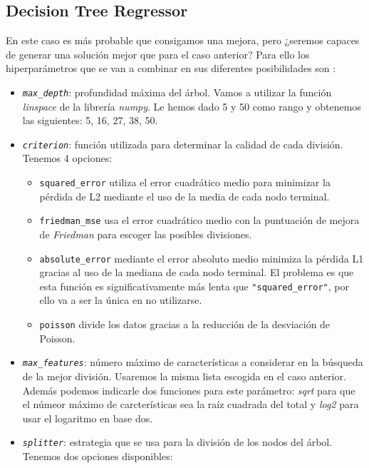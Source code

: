 \subsection{Decision Tree Regressor}
En este caso es más probable que consigamos una mejora, pero ¿seremos capaces de generar una solución mejor que para el caso anterior?
Para ello los hiperparámetros que se van a combinar en sus diferentes posibilidades son \cite{sklearn:decisiontreeregressor}:
\begin{itemize}
    \item \texttt{\textit{max\_depth}}: profundidad máxima del árbol. Vamos a utilizar la función \textit{linspace} de la librería \textit{numpy}. Le hemos dado 5 y 50 como rango y obtenemos las siguientes: 5, 16, 27, 38, 50.
    \item \texttt{\textit{criterion}}: función utilizada para determinar la calidad de cada división. Tenemos 4 opciones:
        \begin{itemize}
            \item \texttt{squared\_error} utiliza el error cuadrático medio para minimizar la pérdida de L2 mediante el uso de la media de cada nodo terminal.
            \item \texttt{friedman\_mse} usa el error cuadrático medio con la puntuación de mejora de \textit{Friedman} para escoger las posibles divisiones.
            \item \texttt{absolute\_error} mediante el error absoluto medio  minimiza la pérdida L1 gracias al uso de la mediana de cada nodo terminal. El problema es que esta función es significativamente más lenta que \texttt{"squared\_error"}, por ello va a ser la única en no utilizarse.
            \item \texttt{poisson} divide los datos gracias a la reducción de la desviación de Poisson. 
        \end{itemize}
    \item \texttt{\textit{max\_features}}: número máximo de características a considerar en la búsqueda de la mejor división. Usaremos la misma lista escogida en el caso anterior.
    Además podemos indicarle dos funciones para este parámetro: \textit{sqrt} para que el númeor máximo de carcterísticas sea la raíz cuadrada del total y \textit{log2} para usar el logaritmo en base dos.
    \item \texttt{\textit{splitter}}: estrategia que se usa para la división de los nodos del árbol. Tenemos dos opciones disponibles:
        \begin{itemize}

\end{itemize}
\end{itemize}
